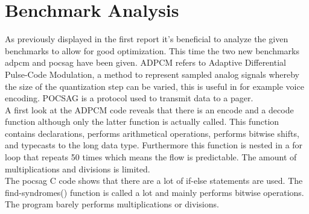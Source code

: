 \section{Benchmark Analysis}
As previously displayed in the first report it's beneficial to analyze the given benchmarks to allow for good optimization. This time the two new benchmarks adpcm and pocsag have been given. ADPCM refers to Adaptive Differential Pulse-Code Modulation, a method to represent sampled analog signals whereby the size of the quantization step can be varied, this is useful in for example voice encoding. POCSAG is a protocol used to transmit data to a pager.\\
A first look at the ADPCM code reveals that there is an encode and a decode function although only the latter function is actually called. This function contains declarations, performs arithmetical operations, performs bitwise shifts, and typecasts to the long data type. Furthermore this function is nested in a for loop that repeats 50 times which means the flow is predictable. The amount of multiplications and divisions is limited.\\
The pocsag C code shows that there are a lot of if-else statements are used. The find-syndromes() function is called a lot and mainly performs bitwise operations. The program barely performs multiplications or divisions.